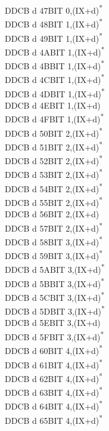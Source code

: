 \documentclass[twoside,openright,a4paper]{book}
\begin{document}
\begin{multicols}{3}
{\begin{tabbing}
	DDCB d 47\>BIT 0,(IX+d)\textsuperscript{*}\\
	DDCB d 48\>BIT 1,(IX+d)\textsuperscript{*}\\
	DDCB d 49\>BIT 1,(IX+d)\textsuperscript{*}\\
	DDCB d 4A\>BIT 1,(IX+d)\textsuperscript{*}\\
	DDCB d 4B\>BIT 1,(IX+d)\textsuperscript{*}\\
	DDCB d 4C\>BIT 1,(IX+d)\textsuperscript{*}\\
	DDCB d 4D\>BIT 1,(IX+d)\textsuperscript{*}\\
	DDCB d 4E\>BIT 1,(IX+d)\\
	DDCB d 4F\>BIT 1,(IX+d)\textsuperscript{*}\\
	DDCB d 50\>BIT 2,(IX+d)\textsuperscript{*}\\
	DDCB d 51\>BIT 2,(IX+d)\textsuperscript{*}\\
	DDCB d 52\>BIT 2,(IX+d)\textsuperscript{*}\\
	DDCB d 53\>BIT 2,(IX+d)\textsuperscript{*}\\
	DDCB d 54\>BIT 2,(IX+d)\textsuperscript{*}\\
	DDCB d 55\>BIT 2,(IX+d)\textsuperscript{*}\\
	DDCB d 56\>BIT 2,(IX+d)\\
	DDCB d 57\>BIT 2,(IX+d)\textsuperscript{*}\\
	DDCB d 58\>BIT 3,(IX+d)\textsuperscript{*}\\
	DDCB d 59\>BIT 3,(IX+d)\textsuperscript{*}\\
	DDCB d 5A\>BIT 3,(IX+d)\textsuperscript{*}\\
	DDCB d 5B\>BIT 3,(IX+d)\textsuperscript{*}\\
	DDCB d 5C\>BIT 3,(IX+d)\textsuperscript{*}\\
	DDCB d 5D\>BIT 3,(IX+d)\textsuperscript{*}\\
	DDCB d 5E\>BIT 3,(IX+d)\\
	DDCB d 5F\>BIT 3,(IX+d)\textsuperscript{*}\\
	DDCB d 60\>BIT 4,(IX+d)\textsuperscript{*}\\
	DDCB d 61\>BIT 4,(IX+d)\textsuperscript{*}\\
	DDCB d 62\>BIT 4,(IX+d)\textsuperscript{*}\\
	DDCB d 63\>BIT 4,(IX+d)\textsuperscript{*}\\
	DDCB d 64\>BIT 4,(IX+d)\textsuperscript{*}\\
	DDCB d 65\>BIT 4,(IX+d)\textsuperscript{*}\\

\end{tabbing}}
\end{multicols}
\end{document}

